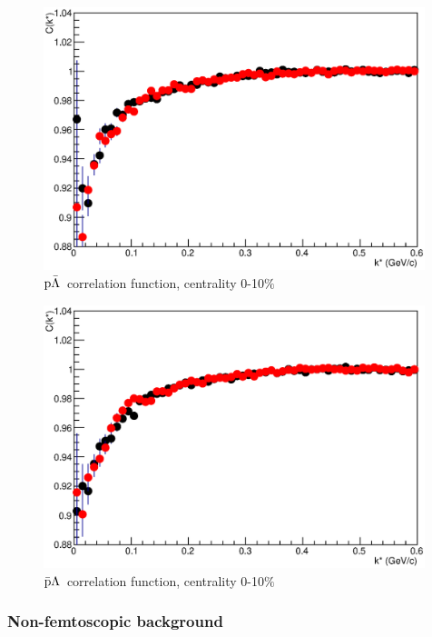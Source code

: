 \documentclass[ALICE,manyauthors]{ALICE_analysis_notes}
\newcommand{\pal}{$\rm p\bar{\rm \Lambda}$}
\newcommand{\apl}{$\bar{\rm p }\Lambda$}
\begin{document}
\begin{figure}[]
   \centering
   \includegraphics[width=0.99\textwidth]{pics/compPAL}
   \caption{ \pal~correlation function, centrality 0-10$\%$}
   \label{fig:palCorrFun}
 \end{figure}

\begin{figure}[]
   \centering
   \includegraphics[width=0.99\textwidth]{pics/compAPL}
   \caption{ \apl~correlation function, centrality 0-10$\%$}
   \label{fig:aplCorrFun}
 \end{figure}

\subsubsection{Non-femtoscopic background}
\end{document}
